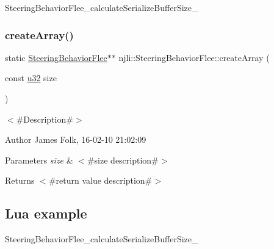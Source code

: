 \begin{DoxyCodeInclude}
\end{DoxyCodeInclude}
Steering\+Behavior\+Flee\+\_\+calculate\+Serialize\+Buffer\+Size\+\_\+ \mbox{\label{classnjli_1_1_steering_behavior_flee_a3424227cb7b8018b59977e6936339a54}} 
\subsubsection{\texorpdfstring{create\+Array()}{createArray()}}
{\footnotesize\ttfamily static \mbox{\hyperlink{classnjli_1_1_steering_behavior_flee}{Steering\+Behavior\+Flee}}$\ast$$\ast$ njli\+::\+Steering\+Behavior\+Flee\+::create\+Array (\begin{DoxyParamCaption}\item[{const \mbox{\hyperlink{_util_8h_a10e94b422ef0c20dcdec20d31a1f5049}{u32}}}]{size }\end{DoxyParamCaption})\hspace{0.3cm}{\ttfamily [static]}}



$<$\#\+Description\#$>$ 

\begin{DoxyAuthor}{Author}
James Folk, 16-\/02-\/10 21\+:02\+:09
\end{DoxyAuthor}

\begin{DoxyParams}{Parameters}
{\em size} & $<$\#size description\#$>$\\
\hline
\end{DoxyParams}
\begin{DoxyReturn}{Returns}
$<$\#return value description\#$>$
\end{DoxyReturn}
\hypertarget{classnjli_1_1_steering_behavior_wander_ex1}{}\subsection{Lua example}\label{classnjli_1_1_steering_behavior_wander_ex1}

\begin{DoxyCodeInclude}
\end{DoxyCodeInclude}
Steering\+Behavior\+Flee\+\_\+calculate\+Serialize\+Buffer\+Size\+\_\+ \mbox{\label{classnjli_1_1_steering_behavior_flee_a3c9d9cc3934c6c6e12f44298f5189a6f}} 
